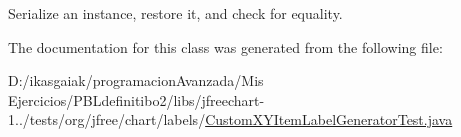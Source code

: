 Serialize an instance, restore it, and check for equality. 

The documentation for this class was generated from the following file\+:\begin{DoxyCompactItemize}
\item 
D\+:/ikasgaiak/programacion\+Avanzada/\+Mis Ejercicios/\+P\+B\+Ldefinitibo2/libs/jfreechart-\/1../tests/org/jfree/chart/labels/\mbox{\hyperlink{_custom_x_y_item_label_generator_test_8java}{Custom\+X\+Y\+Item\+Label\+Generator\+Test.\+java}}\end{DoxyCompactItemize}
